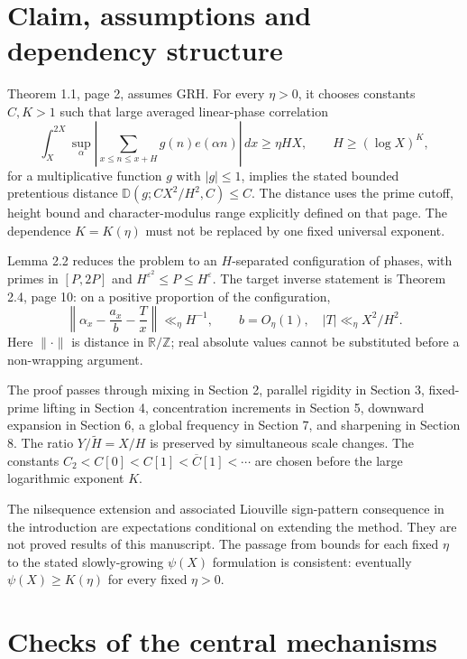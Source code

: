 \documentclass[10pt]{article}
\begin{document}
\section*{Claim, assumptions and dependency structure}
Theorem 1.1, page 2, assumes GRH. For every \(\eta>0\), it chooses constants \(C,K>1\) such that large averaged linear-phase correlation \[\int_X^{2X}\sup_\alpha
 \left|\sum_{x\le n\le x+H}g(n)e(\alpha n)\right|\,dx
 \ge\eta HX,\qquad H\ge(\log X)^K ,\] for a multiplicative function \(g\) with \(|g|\le1\), implies the stated bounded pretentious distance \(\mathbb D(g;CX^2/H^2,C)\le C\). The distance uses the prime cutoff, height bound and character-modulus range explicitly defined on that page. The dependence \(K=K(\eta)\) must not be replaced by one fixed universal exponent.\par
Lemma 2.2 reduces the problem to an \(H\)-separated configuration of phases, with primes in \([P,2P]\) and \(H^{\varepsilon^2}\le P\le H^\varepsilon\). The target inverse statement is Theorem 2.4, page 10: on a positive proportion of the configuration, \[\left\|\alpha_x-\frac{a_x}{b}-\frac{T}{x}\right\|
 \ll_\eta H^{-1},\qquad b=O_\eta(1),\quad
 |T|\ll_\eta X^2/H^2 .\] Here \(\|\cdot\|\) is distance in \(\mathbb R/\mathbb Z\); real absolute values cannot be substituted before a non-wrapping argument.\par
The proof passes through mixing in Section 2, parallel rigidity in Section 3, fixed-prime lifting in Section 4, concentration increments in Section 5, downward expansion in Section 6, a global frequency in Section 7, and sharpening in Section 8. The ratio \(Y/\widetilde H=X/H\) is preserved by simultaneous scale changes. The constants \(C_2<C[0]<C[1]<\overline C[1]<\cdots\) are chosen before the large logarithmic exponent \(K\).\par
The nilsequence extension and associated Liouville sign-pattern consequence in the introduction are expectations conditional on extending the method. They are not proved results of this manuscript. The passage from bounds for each fixed \(\eta\) to the stated slowly-growing \(\psi(X)\) formulation is consistent: eventually \(\psi(X)\ge K(\eta)\) for every fixed \(\eta>0\).\par
\section*{Checks of the central mechanisms}
\end{document}
